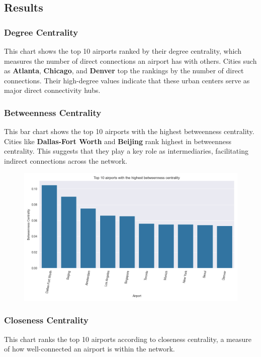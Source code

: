 \documentclass[12pt]{article}
\begin{document}
    \subsection{Results}\label{subsec:results}

    \subsubsection{Degree Centrality}
    This chart shows the top 10 airports ranked by their degree centrality, which measures the number of direct connections an airport has with others. Cities such as \textbf{Atlanta}, \textbf{Chicago}, and \textbf{Denver} top the rankings by the number of direct connections.
    Their high-degree values indicate that these urban centers serve as major direct connectivity hubs.

    \subsubsection{Betweenness Centrality}
    This bar chart shows the top 10 airports with the highest betweenness centrality. Cities like \textbf{Dallas-Fort Worth} and \textbf{Beijing} rank highest in betweenness centrality. This suggests that they play a key role as intermediaries, facilitating indirect connections across the network.

    \begin{figure}[H]
        \centering
        \includegraphics[width=0.8\linewidth]{img/betweenness_centrality}
    \end{figure}

    \subsubsection{Closeness Centrality}
    This chart ranks the top 10 airports according to closeness centrality, a measure of how well-connected an airport is within the network.
\end{document}
